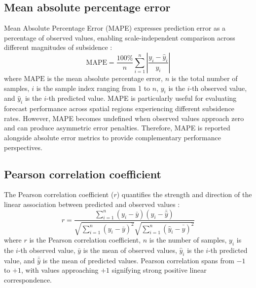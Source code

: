 \documentclass[oneside,doublespacing,flushright]{lsuthesis}
\begin{document}
\subsection{Mean absolute percentage error}
Mean Absolute Percentage Error (MAPE) expresses prediction error as a percentage of observed values, enabling scale-independent comparison across different magnitudes of subsidence \citep{Hyndman2006}:
\begin{equation}
\text{MAPE} = \frac{100\%}{n}\sum_{i=1}^{n}\left|\frac{y_i - \hat{y}_i}{y_i}\right|
\end{equation}
where $\text{MAPE}$ is the mean absolute percentage error, $n$ is the total number of samples, $i$ is the sample index ranging from 1 to $n$, $y_i$ is the $i$-th observed value, and $\hat{y}_i$ is the $i$-th predicted value. MAPE is particularly useful for evaluating forecast performance across spatial regions experiencing different subsidence rates. However, MAPE becomes undefined when observed values approach zero and can produce asymmetric error penalties. Therefore, MAPE is reported alongside absolute error metrics to provide complementary performance perspectives.

\subsection{Pearson correlation coefficient}
The Pearson correlation coefficient ($r$) quantifies the strength and direction of the linear association between predicted and observed values \citep{Rodgers1988}:
\begin{equation}
r = \frac{\sum_{i=1}^{n}(y_i - \bar{y})(\hat{y}_i - \bar{\hat{y}})}{\sqrt{\sum_{i=1}^{n}(y_i - \bar{y})^2}\sqrt{\sum_{i=1}^{n}(\hat{y}_i - \bar{\hat{y}})^2}}
\end{equation}
where $r$ is the Pearson correlation coefficient, $n$ is the number of samples, $y_i$ is the $i$-th observed value, $\bar{y}$ is the mean of observed values, $\hat{y}_i$ is the $i$-th predicted value, and $\bar{\hat{y}}$ is the mean of predicted values. 
Pearson correlation spans from $-1$ to $+1$, with values approaching $+1$ signifying strong positive linear correspondence.
\end{document}
